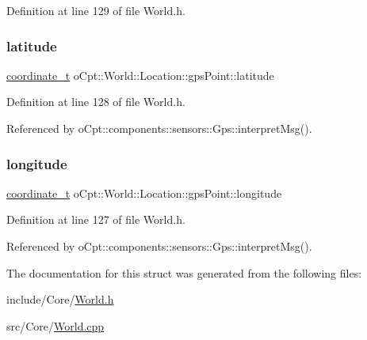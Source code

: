 Definition at line 129 of file World.\+h.

\hypertarget{structo_cpt_1_1_world_1_1_location_1_1gps_point_a28047329a2c8750f2d6c54dfa3ce8bb4}{}\label{structo_cpt_1_1_world_1_1_location_1_1gps_point_a28047329a2c8750f2d6c54dfa3ce8bb4} 
\subsubsection{\texorpdfstring{latitude}{latitude}}
{\footnotesize\ttfamily \hyperlink{classo_cpt_1_1_world_1_1_location_ade9263a17c41b7af085dfcb9055b18f3}{coordinate\+\_\+t} o\+Cpt\+::\+World\+::\+Location\+::gps\+Point\+::latitude}



Definition at line 128 of file World.\+h.



Referenced by o\+Cpt\+::components\+::sensors\+::\+Gps\+::interpret\+Msg().

\hypertarget{structo_cpt_1_1_world_1_1_location_1_1gps_point_a043e3f4795590cee2c41df63769c3b17}{}\label{structo_cpt_1_1_world_1_1_location_1_1gps_point_a043e3f4795590cee2c41df63769c3b17} 
\subsubsection{\texorpdfstring{longitude}{longitude}}
{\footnotesize\ttfamily \hyperlink{classo_cpt_1_1_world_1_1_location_ade9263a17c41b7af085dfcb9055b18f3}{coordinate\+\_\+t} o\+Cpt\+::\+World\+::\+Location\+::gps\+Point\+::longitude}



Definition at line 127 of file World.\+h.



Referenced by o\+Cpt\+::components\+::sensors\+::\+Gps\+::interpret\+Msg().



The documentation for this struct was generated from the following files\+:\begin{DoxyCompactItemize}
\item 
include/\+Core/\hyperlink{_world_8h}{World.\+h}\item 
src/\+Core/\hyperlink{_world_8cpp}{World.\+cpp}\end{DoxyCompactItemize}

